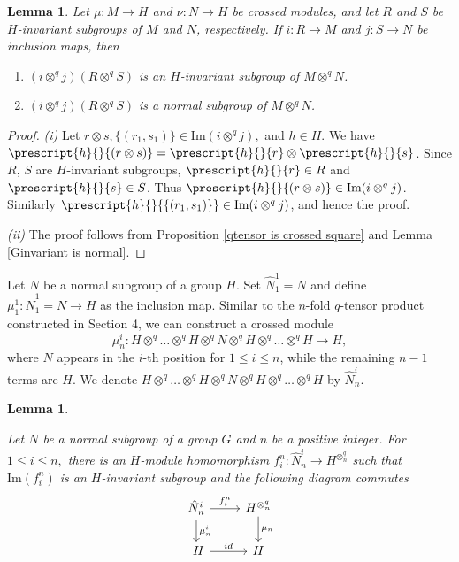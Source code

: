 \documentclass[12pt]{elsarticle}
\newtheorem{lemma}[theorem]{Lemma}
\newtheorem*{main corollary*}{Main Corollary}
\theoremstyle{definition}
\newcommand{\tens}{
	\otimes^q}
\newcommand{\im}[1]{\text{Im}{(#1)}}
\begin{document}
 \begin{lemma}\label{Lemma_Hinvariant}
    Let $\mu:M\to H$ and $\nu:N\to H$ be crossed modules, and let $R$ and $S$ be $H$-invariant subgroups of $M$ and $N$, respectively. If $i:R\to M$ and $j:S\to N$ be inclusion maps, then 
    \begin{enumerate}
        \item [(i)]  $(i\tens j)(R\tens S)$ is an $H$-invariant subgroup of $M\tens N$.
        \item [(ii)] $(i\tens j)(R\tens S)$ is a normal subgroup of $M\tens N$.
    \end{enumerate}
    
\end{lemma}
\begin{proof} 
\textit{(i)} Let $r\otimes s, \{(r_1,s_1)\}\in \im{i\tens j},$ and $h\in H$. We have $\prescript{h}{}{(r\otimes s)}=\prescript{h}{}{r}\otimes \prescript{h}{}{s}$. Since $R$, $S$ are $H$-invariant subgroups, $\prescript{h}{}{r}\in R$ and $\prescript{h}{}{s}\in S$. Thus $\prescript{h}{}{(r\otimes s)}\in \im{i\tens j}$. Similarly $\prescript{h}{}{\{(r_1,s_1)\}}\in \im{i\tens j}$, and hence the proof.

\par\textit{(ii)} The proof follows from Proposition \ref{qtensor is crossed square} and Lemma \ref{Ginvariant is normal}.
\end{proof}
 Let $N$ be a normal subgroup of a group $H$. Set $\hat{N}_1^1=N$ and define $\mu_1^1:\hat{N}_1^1=N\to H$ as the inclusion map. Similar to the $n$-fold $q$-tensor product constructed in Section 4, we can construct a crossed module  
 \[\mu_n^i:H \tens\ldots \tens H \tens N \tens H \tens\ldots \tens H \to H,\]
 where $N$ appears in the $i$-th position for $1\leq i\leq n$, while the remaining $n-1$ terms are $H$. We denote $H \tens\ldots \tens H \tens N \tens H \tens \ldots \tens H$ by $\hat{N}^{i}_n$.
 \begin{lemma}\label{{N}_i normality}
     
 
    Let $N$ be a normal subgroup of a group $G$ and $n$ be a positive integer. For $1\leq i\leq n,$ there is an $H$-module homomorphism ${f_i^n:\hat{N}_n^{i}\to H^{\otimes^q_{n}}}$ such that $\im{f_i^n}$ is an $H$-invariant subgroup and the following diagram commutes \begin{equation}
      	\begin{tikzcd} 	
			\hat{N}^i_{n} \arrow[r,"f_i^n"]\arrow[d,"\mu ^{i}_{n}"] & H^{\otimes^{q}_{n}} \arrow[d,"\mu_n"] 
			\\\ H \arrow[r,"id"]& H
			\end{tikzcd} \label{N_i commutativity Lemma}
  \end{equation}    
\end{lemma}
\end{document}
